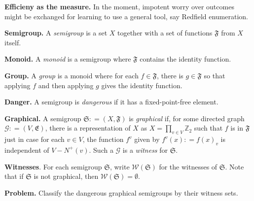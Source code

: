 \documentclass[12pt]{amsart}
\title{}
\theoremstyle{plain}
\theoremstyle{definition}
\theoremstyle{remark}
\newcommand{\fancy}[1]{\mathcal{#1}}
\newcommand{\G}{\fancy{G}}
\newcommand{\DefinedAs}{\mathrel{\mathop:}=}
\newcommand{\F}{\mathfrak{F}}
\renewcommand{\S}{\mathfrak{S}}
\newcommand{\E}{\mathfrak{E}}
\newcommand{\W}{\fancy{W}}
\begin{document}
\maketitle

\textbf{Efficieny as the measure.} In the moment, impotent worry over outcomes might be exchanged for learning to use a general tool, say Redfield enumeration.

\textbf{Semigroup.} A \emph{semigroup} is a set $X$ together with a set of functions $\F$ from $X$ itself.

\textbf{Monoid.} A \emph{monoid} is a semigroup where $\F$ contains the identity function.

\textbf{Group.} A \emph{group} is a monoid where for each $f \in \F$, there is $g \in \F$ so that applying $f$ and then applying $g$ gives the identity function.

\textbf{Danger.} A semigroup is \emph{dangerous} if it has a fixed-point-free element.

\textbf{Graphical.} A semigroup $\S \DefinedAs (X, \F)$ is \emph{graphical} if, for some directed graph $\G \DefinedAs (V, \E)$, there is a representation of $X$ as $X = \prod_{v\in V} \mathbb{Z}_2$ such that $f$ is in $\F$ just in case for each $v \in V$, the function $f^v$ given by $f^v(x) \DefinedAs f(x)_v$ is independent of $V - N^+(v)$.  Such a $\G$ is a \emph{witness} for $\S$.

\textbf{Witnesses}. For each semigroup $\S$, write $\W(\S)$ for the witnesses of $\S$.  Note that if $\S$ is not graphical, then $\W(\S) = \emptyset$.

\textbf{Problem.} Classify the dangerous graphical semigroups by their witness sets.
\end{document}
